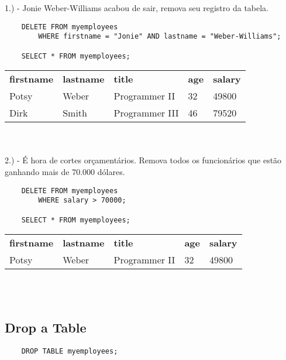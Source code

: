 1.) - Jonie Weber-Williams acabou de sair, remova seu registro da tabela.

\begin{lstlisting}
    DELETE FROM myemployees
	    WHERE firstname = "Jonie" AND lastname = "Weber-Williams";

    SELECT * FROM myemployees;
\end{lstlisting}

\begin{tabular}{l l l l l}
    {\textbf{firstname}} & {\textbf{lastname}} & {\textbf{title}} & {\textbf{age}} & {\textbf{salary}} \\
    {Potsy}              & {Weber}             & {Programmer II}     & {32}           & {49800}           \\
    {Dirk}               & {Smith}             & {Programmer III}  & {46}           & {79520}          
\end{tabular} \\ \\

2.) - É hora de cortes orçamentários. Remova todos os funcionários que estão ganhando mais de 70.000 dólares.

\begin{lstlisting}
    DELETE FROM myemployees
	    WHERE salary > 70000;

    SELECT * FROM myemployees;
\end{lstlisting}

\begin{tabular}{l l l l l}
    {\textbf{firstname}} & {\textbf{lastname}} & {\textbf{title}} & {\textbf{age}} & {\textbf{salary}} \\
    {Potsy}              & {Weber}             & {Programmer II}     & {32}           & {49800}       
\end{tabular} \\ \\

\subsection{Drop a Table}

\begin{lstlisting}
    DROP TABLE myemployees;
\end{lstlisting}